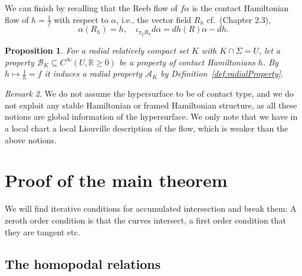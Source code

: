 \documentclass{amsart}
\newcommand{\Acal}{{\mathcal{A}}}
\newcommand{\Bcal}{{\mathcal{B}}}
\newcommand{\RR}{\mathbb{R}}
\newtheorem{proposition}{Proposition}[section]
\theoremstyle{definition}
\theoremstyle{remark}
\newtheorem{remark}[proposition]{Remark}
\numberwithin{equation}{section}
\begin{document}
We can finish by recalling that the Reeb flow of $f\alpha$ is the contact Hamiltonian flow of $h=\frac 1f$ with respect to $\alpha$, i.e., the vector field $R_h$ cf.~\cite{Geiges}(Chapter 2.3),
$$\alpha(R_h)=h,\quad \iota_{\pi_\xi R_h} d\alpha = dh(R)\alpha - dh.$$

\begin{proposition}
    For a radial relatively compact set $K$ with $K\cap\Sigma=U$, let a property $\Bcal_K\subseteq C^\infty(U,\RR\geq 0)$ be a property of contact Hamiltonians $h$. By $h\mapsto \frac 1h=f$ it induces a radial property $\Acal_K$ by Definition~\ref{def:radialProperty}.
\end{proposition}

\begin{remark}
    We do not assume the hypersurface to be of contact type, and we do not exploit any stable Hamiltonian or framed Hamiltonian structure, as all these notions are global information of the hypersurface. We only note that we have in a local chart a local Liouville description of the flow, which is weaker than the above notions. 
\end{remark}








\section{Proof of the main theorem}\label{subsec:Bas}

We will find iterative conditions for accumulated intersection and break them: A zeroth order condition is that the curves intersect, a first order condition that they are tangent etc.


\subsection{The homopodal relations}
\end{document}
